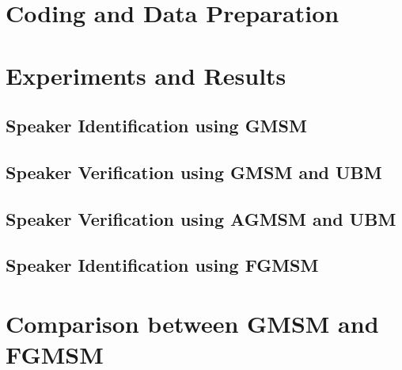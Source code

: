 \section{Coding and Data Preparation}
\label{sec:coding-and-data-preparation}

\section{Experiments and Results}
\label{sec:experiments-and-results}

\subsection{Speaker Identification using GMSM}

\subsection{Speaker Verification using GMSM and UBM}

\subsection{Speaker Verification using AGMSM and UBM}

\subsection{Speaker Identification using FGMSM}

\section{Comparison between GMSM and FGMSM}
